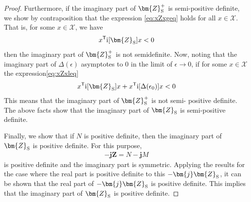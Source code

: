 \documentclass[graybox, envcountchap]{svmult}
\begin{document}
\begin{proof}
Furthermore, if the imaginary part of $ \bm{Z}_{\rm S}^{+} $ is semi-positive definite, we show by contraposition that the expression \ref{eq:xZxgeq} holds for all $x \in \mathcal{X}$.
That is, for some $x \in \mathcal{X}$, we have
\begin{equation}\label{eq:xZxleq}
x^{\sf T} \imag[\bm{Z}_{\rm S}] x < 0
\end{equation}
then the imaginary part of $ \bm{Z}_{\rm S}^{+} $ is not semidefinite.
Now, noting that the imaginary part of $\Delta(\epsilon)$ asymptotes to 0 in the limit of $\epsilon \rightarrow 0$, if for some $x \in \mathcal{X}$ the expression\ref{eq:xZxleq}
\begin{align*}
x^{\sf T} \imag[ \bm{Z}_{\rm S}] x 
+
x^{\sf T} \imag[\Delta(\epsilon_0)]x < 0
\end{align*}
This means that the imaginary part of $\bm{Z}_{\rm S}^{+} $ is not semi- positive definite.
The above facts show that the imaginary part of $\bm{Z}_{\rm S}$ is semi-positive definite.

Finally, we show that if $N$ is positive definite, then the imaginary part of $\bm{Z}_{\rm S}$ is positive definite.
For this purpose, 
\begin{align*}
-\bm{j} \bm{Z} = N - \bm{j} M
\end{align*}
is positive definite and the imaginary part is symmetric.
Applying the results for the case where the real part is positive definite to this $-\bm{j} \bm{Z}_{\rm S}$, it can be shown that the real part of $-\bm{j} \bm{Z}_{\rm S}$ is positive definite.
This implies that the imaginary part of $\bm{Z}_{\rm S}$ is positive definite.
\end{proof}


\end{document}
